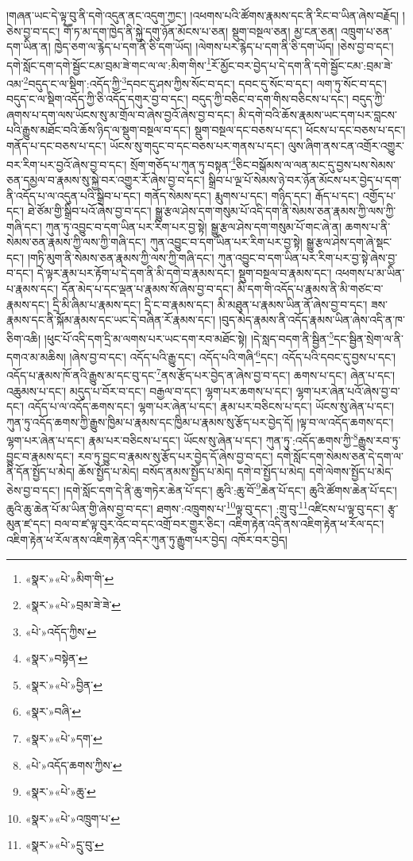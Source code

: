 །གཞན་ཡང་དེ་ལྟ་བུ་ནི་དགེ་འདུན་ནང་འདུག་ཀྱང་། །འཕགས་པའི་ཚོགས་རྣམས་དང་ནི་རིང་བ་ཡིན་ཞེས་བརྗོད། །ཅེས་བྱ་བ་དང་། གཽ་ཏ་མ་དག་ཁྱེད་ནི་སྐྱེ་དགུ་ཉོན་མོངས་པ་ཅན། སྡུག་བསྔལ་ཅན། མྱ་ངན་ཅན། འཁྲུག་པ་ཅན་དག་ཡིན་ན། ཁྱེད་ཅག་ལ་རྙེད་པ་དག་ནི་ཅི་དག་ཡོད། །ལེགས་པར་རྙེད་པ་དག་ནི་ཅི་དག་ཡོད། །ཅེས་བྱ་བ་དང་། དགེ་སློང་དག་དགེ་སྦྱོང་ངམ་བྲམ་ཟེ་གང་ལ་ལ་:མིག་གིས་\footnote{«སྣར་»«པེ་»མིག་གི་}རོ་མྱོང་བར་བྱེད་པ་དེ་དག་ནི་དགེ་སྦྱོང་ངམ་:བྲམ་ཟེ་འམ་\footnote{«སྣར་»«པེ་»བྲམ་ཟེ་ཟེ་}བདུད་ང་ལ་སྡིག་:འདོད་ཀྱི་\footnote{«པེ་»འདོད་ཀྱིས་}དབང་དུ་ཤས་ཀྱིས་སོང་བ་དང་། དབང་དུ་སོང་བ་དང་། ལག་ཏུ་སོང་བ་དང་། བདུད་ང་ལ་སྡིག་འདོད་ཀྱི་ཅི་འདོད་དགུར་བྱ་བ་དང་། བདུད་ཀྱི་བཅིང་བ་དག་གིས་བཅིངས་པ་དང་། བདུད་ཀྱི་ཞགས་པ་དག་ལས་ཡོངས་སུ་མ་གྲོལ་བ་ཞེས་བྱའོ་ཞེས་བྱ་བ་དང་། མི་དགེ་བའི་ཆོས་རྣམས་ཡང་དག་པར་བླངས་པའི་རྒྱུས་མཐོང་བའི་ཆོས་ཉིད་ལ་སྡུག་བསྔལ་བ་དང་། སྡུག་བསྔལ་དང་བཅས་པ་དང་། ཕོངས་པ་དང་བཅས་པ་དང་། གནོད་པ་དང་བཅས་པ་དང་། ཡོངས་སུ་གདུང་བ་དང་བཅས་པར་གནས་པ་དང་། ལུས་ཞིག་ནས་ངན་འགྲོར་འགྱུར་བར་རིག་པར་བྱའོ་ཞེས་བྱ་བ་དང་། སྲོག་གཅོད་པ་ཀུན་ཏུ་བསྟན་\footnote{«སྣར་»བསྟེན་}ཅིང་བསྒོམས་ལ་ལན་མང་དུ་བྱས་པས་སེམས་ཅན་དམྱལ་བ་རྣམས་སུ་སྐྱེ་བར་འགྱུར་རོ་ཞེས་བྱ་བ་དང་། སྒྲིབ་པ་ལྔ་པོ་སེམས་ཉེ་བར་ཉོན་མོངས་པར་བྱེད་པ་དག་ནི་འདོད་པ་ལ་འདུན་པའི་སྒྲིབ་པ་དང་། གནོད་སེམས་དང་། རྨུགས་པ་དང་། གཉིད་དང་། རྒོད་པ་དང་། འགྱོད་པ་དང་། ཐེ་ཙོམ་གྱི་སྒྲིབ་པའོ་ཞེས་བྱ་བ་དང་། སྒྱུ་རྩལ་ཤེས་དག་གསུམ་པོ་འདི་དག་ནི་སེམས་ཅན་རྣམས་ཀྱི་ལས་ཀྱི་གཞི་དང་། ཀུན་ཏུ་འབྱུང་བ་དག་ཡིན་པར་རིག་པར་བྱ་སྟེ། སྒྱུ་རྩལ་ཤེས་དག་གསུམ་པོ་གང་ཞེ་ན། ཆགས་པ་ནི་སེམས་ཅན་རྣམས་ཀྱི་ལས་ཀྱི་གཞི་དང་། ཀུན་འབྱུང་བ་དག་ཡིན་པར་རིག་པར་བྱ་སྟེ། སྒྱུ་རྩལ་ཤེས་དག་ཞེ་སྡང་དང་། །གཏི་མུག་ནི་སེམས་ཅན་རྣམས་ཀྱི་ལས་ཀྱི་གཞི་དང་། ཀུན་འབྱུང་བ་དག་ཡིན་པར་རིག་པར་བྱ་སྟེ་ཞེས་བྱ་བ་དང་། དེ་ལྟར་རྣམ་པར་རྟོག་པ་དེ་དག་ནི་མི་དགེ་བ་རྣམས་དང་། སྡུག་བསྔལ་བ་རྣམས་དང་། འཕགས་པ་མ་ཡིན་པ་རྣམས་དང་། དོན་མེད་པ་དང་ལྡན་པ་རྣམས་སོ་ཞེས་བྱ་བ་དང་། མི་དག་གི་འདོད་པ་རྣམས་ནི་མི་གཙང་བ་རྣམས་དང་། དྲི་མི་ཞིམ་པ་རྣམས་དང་། དྲི་ང་བ་རྣམས་དང་། མི་མཐུན་པ་རྣམས་ཡིན་ནོ་ཞེས་བྱ་བ་དང་། ཟས་རྣམས་དང་ནི་སྐོམ་རྣམས་དང་ཡང་དེ་བཞིན་རོ་རྣམས་དང་། །བུད་མེད་རྣམས་ནི་འདོད་རྣམས་ཡིན་ཞེས་འདི་ན་ཁ་ཅིག་འཆི། །ཕུང་པོ་འདི་དག་དྲི་མ་ལགས་པར་ཡང་དག་རབ་མཐོང་སྟེ། །དེ་སླད་བདག་ནི་སྦྱིན་\footnote{«སྣར་»«པེ་»བྱིན་}དང་སྦྱིན་སྲེག་ལ་ནི་དགའ་མ་མཆིས། །ཞེས་བྱ་བ་དང་། འདོད་པའི་རྒྱུ་དང་། འདོད་པའི་གཞི་\footnote{«སྣར་»བཞི་}དང་། འདོད་པའི་དབང་དུ་བྱས་པ་དང་། འདོད་པ་རྣམས་ཁོ་ནའི་རྒྱུས་མ་དང་བུ་དང་\footnote{«སྣར་»«པེ་»དག་}ནས་རྩོད་པར་བྱེད་ན་ཞེས་བྱ་བ་དང་། ཆགས་པ་དང་། ཞེན་པ་དང་། འཆུམས་པ་དང་། མདུད་པ་བོར་བ་དང་། བརྒྱལ་བ་དང་། ལྷག་པར་ཆགས་པ་དང་། ལྷག་པར་ཞེན་པའོ་ཞེས་བྱ་བ་དང་། འདོད་པ་ལ་འདོད་ཆགས་དང་། ལྷག་པར་ཞེན་པ་དང་། རྣམ་པར་བཅིངས་པ་དང་། ཡོངས་སུ་ཞེན་པ་དང་། ཀུན་ཏུ་འདོད་ཆགས་ཀྱི་རྒྱུས་ཁྱིམ་པ་རྣམས་དང་ཁྱིམ་པ་རྣམས་སུ་རྩོད་པར་བྱེད་དོ། །ལྟ་བ་ལ་འདོད་ཆགས་དང་། ལྷག་པར་ཞེན་པ་དང་། རྣམ་པར་བཅིངས་པ་དང་། ཡོངས་སུ་ཞེན་པ་དང་། ཀུན་ཏུ་:འདོད་ཆགས་ཀྱི་\footnote{«པེ་»འདོད་ཆགས་ཀྱིས་}རྒྱུས་རབ་ཏུ་བྱུང་བ་རྣམས་དང་། རབ་ཏུ་བྱུང་བ་རྣམས་སུ་རྩོད་པར་བྱེད་དོ་ཞེས་བྱ་བ་དང་། དགེ་སློང་དག་སེམས་ཅན་དེ་དག་ལ་ནི་དོན་སྤྱོད་པ་མེད། ཆོས་སྤྱོད་པ་མེད། བསོད་ནམས་སྤྱོད་པ་མེད། དགེ་བ་སྤྱོད་པ་མེད། དགེ་ལེགས་སྤྱོད་པ་མེད་ཅེས་བྱ་བ་དང་། །དགེ་སློང་དག་དེ་ནི་ཆུ་གཏེར་ཆེན་པོ་དང་། ཆུའི་:ཆུ་བོ་\footnote{«སྣར་»«པེ་»ཆུ་}ཆེན་པོ་དང་། ཆུའི་ཚོགས་ཆེན་པོ་དང་། ཆུའི་ཆུ་ཆེན་པོ་མ་ཡིན་གྱི་ཞེས་བྱ་བ་དང་། ཐགས་:འཁྲུགས་པ་\footnote{«སྣར་»«པེ་»འཁྲུག་པ་}ལྟ་བུ་དང་། :གྲུ་བུ་\footnote{«སྣར་»«པེ་»དྲུ་བུ་}འཛིངས་པ་ལྟ་བུ་དང་། རྩྭ་མུན་ཛ་དང་། བལ་བ་ཛ་ལྟ་བུར་འོང་བ་དང་འགྲོ་བར་གྱུར་ཅིང་། འཇིག་རྟེན་འདི་ནས་འཇིག་རྟེན་ཕ་རོལ་དང་། འཇིག་རྟེན་ཕ་རོལ་ནས་འཇིག་རྟེན་འདིར་ཀུན་ཏུ་རྒྱུག་པར་བྱེད། འཁོར་བར་བྱེད། 